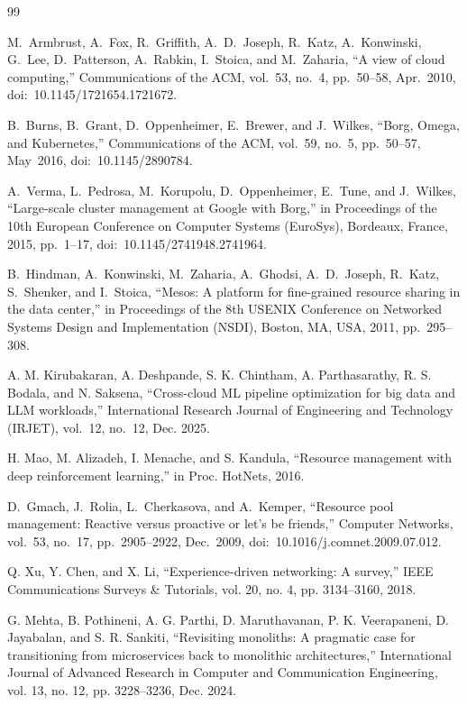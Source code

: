 \documentclass[conference]{IEEEtran}
\begin{document}
\begin{thebibliography}{99}

M.~Armbrust, A.~Fox, R.~Griffith, A.~D.~Joseph, R.~Katz, A.~Konwinski, 
G.~Lee, D.~Patterson, A.~Rabkin, I.~Stoica, and M.~Zaharia,
``A view of cloud computing,'' Communications of the ACM, 
vol.~53, no.~4, pp.~50--58, Apr.~2010, 
doi:~10.1145/1721654.1721672.

B.~Burns, B.~Grant, D.~Oppenheimer, E.~Brewer, and J.~Wilkes,
``Borg, Omega, and Kubernetes,''
Communications of the ACM,
vol.~59, no.~5, pp.~50--57, May~2016,
doi:~10.1145/2890784.


A.~Verma, L.~Pedrosa, M.~Korupolu, D.~Oppenheimer, E.~Tune, and J.~Wilkes,
``Large-scale cluster management at Google with Borg,''
in Proceedings of the 10th European Conference on Computer Systems (EuroSys), 
Bordeaux, France, 2015, pp.~1--17, 
doi:~10.1145/2741948.2741964.


B.~Hindman, A.~Konwinski, M.~Zaharia, A.~Ghodsi, A.~D.~Joseph, R.~Katz, 
S.~Shenker, and I.~Stoica,
``Mesos: A platform for fine-grained resource sharing in the data center,''
in Proceedings of the 8th USENIX Conference on Networked Systems Design and Implementation (NSDI), 
Boston, MA, USA, 2011, pp.~295--308.

A. M. Kirubakaran, A. Deshpande, S. K. Chintham, A. Parthasarathy, R. S. Bodala, and N. Saksena,
``Cross-cloud ML pipeline optimization for big data and LLM workloads,''
International Research Journal of Engineering and Technology (IRJET),
vol.~12, no.~12, Dec. 2025.


H. Mao, M. Alizadeh, I. Menache, and S. Kandula, “Resource management with deep reinforcement learning,” in Proc. HotNets, 2016.

D.~Gmach, J.~Rolia, L.~Cherkasova, and A.~Kemper,
``Resource pool management: Reactive versus proactive or let’s be friends,''
Computer Networks, vol.~53, no.~17, pp.~2905--2922, Dec.~2009,
doi:~10.1016/j.comnet.2009.07.012.

Q. Xu, Y. Chen, and X. Li, “Experience-driven networking: A survey,” IEEE Communications Surveys \& Tutorials, vol. 20, no. 4, pp. 3134–3160, 2018.


G. Mehta, B. Pothineni, A. G. Parthi, D. Maruthavanan, P. K. Veerapaneni, D. Jayabalan, and S. R. Sankiti, “Revisiting monoliths: A pragmatic case for transitioning from microservices back to monolithic architectures,” International Journal of Advanced Research in Computer and Communication Engineering, vol. 13, no. 12, pp. 3228–3236, Dec. 2024.



\end{thebibliography}
\end{document}
